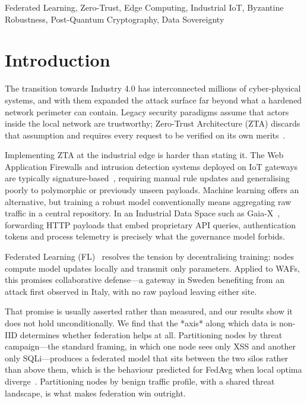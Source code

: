 \documentclass[conference]{IEEEtran}
\begin{document}
\begin{IEEEkeywords}
Federated Learning, Zero-Trust, Edge Computing, Industrial IoT, Byzantine Robustness, Post-Quantum Cryptography, Data Sovereignty
\end{IEEEkeywords}

\section{Introduction}
The transition towards Industry 4.0 has interconnected millions of cyber-physical systems, and with them expanded the attack surface far beyond what a hardened network perimeter can contain. Legacy security paradigms assume that actors inside the local network are trustworthy; Zero-Trust Architecture (ZTA) discards that assumption and requires every request to be verified on its own merits~\cite{zheng2019,nist800207}.

Implementing ZTA at the industrial edge is harder than stating it. The Web Application Firewalls and intrusion detection systems deployed on IoT gateways are typically signature-based~\cite{modsecurity}, requiring manual rule updates and generalising poorly to polymorphic or previously unseen payloads. Machine learning offers an alternative, but training a robust model conventionally means aggregating raw traffic in a central repository. In an Industrial Data Space such as Gaia-X~\cite{gaiaX2021}, forwarding HTTP payloads that embed proprietary API queries, authentication tokens and process telemetry is precisely what the governance model forbids.

Federated Learning (FL)~\cite{mcmahan2017} resolves the tension by decentralising training: nodes compute model updates locally and transmit only parameters. Applied to WAFs, this promises collaborative defense---a gateway in Sweden benefiting from an attack first observed in Italy, with no raw payload leaving either site.

That promise is usually asserted rather than measured, and our results show it does not hold unconditionally. We find that the *axis* along which data is non-IID determines whether federation helps at all. Partitioning nodes by threat campaign---the standard framing, in which one node sees only XSS and another only SQLi---produces a federated model that sits between the two silos rather than above them, which is the behaviour predicted for FedAvg when local optima diverge~\cite{li2020convergence}. Partitioning nodes by benign traffic profile, with a shared threat landscape, is what makes federation win outright.
\end{document}
